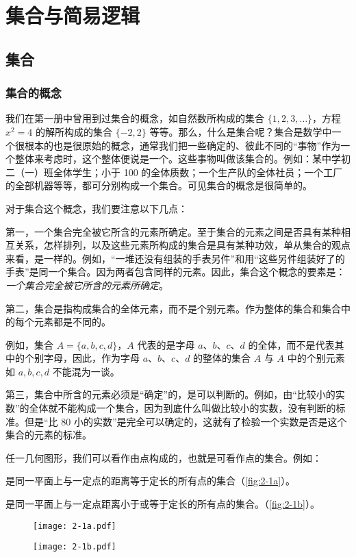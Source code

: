 \chapter{集合与简易逻辑}\label{chp:logic}
\section{集合}
\subsection{集合的概念}
我们在第一册中曾用到过集合的概念，如自然数所构成的集合 $\{1,2,3,\ldots\}$，方程 $x^2=4$ 的解所构成的集合 $\{-2,2\}$ 等等。那么，什么是集合呢？集合是数学中一个很根本的也是很原始的概念，通常我们把一些确定的、彼此不同的“事物”作为一个整体来考虑时，这个整体便说是一个。这些事物叫做该集合的。例如：某中学初二（一）班全体学生；小于 100 的全体质数；一个生产队的全体社员；一个工厂的全部机器等等，都可分别构成一个集合。可见集合的概念是很简单的。

对于集合这个概念，我们要注意以下几点：

第一，一个集合完全被它所含的元素所确定。至于集合的元素之间是否具有某种相互关系，怎样排列，以及这些元素所构成的集合是具有某种功效，单从集合的观点来看，是一样的。例如，“一堆还没有组装的手表另件”和用“这些另件组装好了的手表”是同一个集合。因为两者包含同样的元素。因此，集合这个概念的要素是：\emph{一个集合完全被它所含的元素所确定}。

第二，集合是指构成集合的全体元素，而不是个别元素。作为整体的集合和集合中的每个元素都是不同的。

例如，集合 $A=\{a,b,c,d\}$，$A$ 代表的是字母 $a$、$b$、$c$、$d$ 的全体，而不是代表其中的个别字母，因此，作为字母 $a$、$b$、$c$、$d$ 的整体的集合 $A$ 与 $A$ 中的个别元素如 $a,b,c,d$ 不能混为一谈。

第三，集合中所含的元素必须是“确定”的，是可以判断的。例如，由“比较小的实数”的全体就不能构成一个集合，因为到底什么叫做比较小的实数，没有判断的标准。但是“比 80 小的实数”是完全可以确定的，这就有了检验一个实数是否是这个集合的元素的标准。

任一几何图形，我们可以看作由点构成的，也就是可看作点的集合。例如：

是同一平面上与一定点的距离等于定长的所有点的集合（\cref{fig:2-1a}）。

是同一平面上与一定点距离小于或等于定长的所有点的集合。（\cref{fig:2-1b}）。

\begin{figure}
	\begin{minipage}{0.4\linewidth}\centering
		\texttt{[image: 2-1a.pdf]}
		\subcaption{}\label{fig:2-1a}	
	\end{minipage}
	\begin{minipage}{0.4\linewidth}\centering
		\texttt{[image: 2-1b.pdf]}
		\subcaption{}\label{fig:2-1b}	
	\end{minipage}
	\caption{}\label{fig:2-1}
\end{figure}

